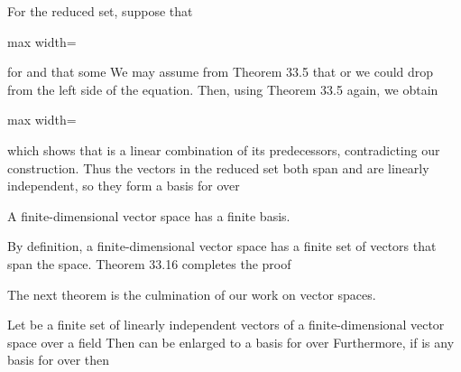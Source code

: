 \documentclass[11pt,oneside]{article}
\begin{document}
\begin{BookBody}
For the reduced set, suppose that

\begin{center}\begin{adjustbox}{max width=\linewidth}\end{adjustbox}\end{center}

\noindent for  and that some  We may assume from Theorem 33.5 that  or we could drop  from the left side of the equation. Then, using Theorem 33.5 again, we obtain

\begin{center}\begin{adjustbox}{max width=\linewidth}\end{adjustbox}\end{center}

\noindent which shows that  is a linear combination of its predecessors, contradicting our construction. Thus the vectors  in the reduced set both span  and are linearly independent, so they form a basis for  over \BookEnd{\blacklozenge}

 A finite-dimensional vector space has a finite basis.

 By definition, a finite-dimensional vector space has a finite set of vectors that span the space. Theorem 33.16 completes the proof\BookEnd{\blacklozenge}

\noindent The next theorem is the culmination of our work on vector spaces.

 Let  be a finite set of linearly independent vectors of a finite-dimensional vector space  over a field  Then  can be enlarged to a basis for  over  Furthermore, if  is any basis for  over  then 


\end{BookBody}
\end{document}
